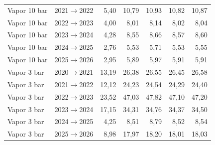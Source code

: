 {\begin{xltabular}{\linewidth}{@{}llrrrrr@{}}
Vapor 10 bar & 2021$\to$2022 & 5,40 & 10,79 & 10,93 & 10,82 & 10,87 \\
Vapor 10 bar & 2022$\to$2023 & 4,00 & 8,01 & 8,14 & 8,02 & 8,04 \\
Vapor 10 bar & 2023$\to$2024 & 4,28 & 8,55 & 8,66 & 8,57 & 8,60 \\
Vapor 10 bar & 2024$\to$2025 & 2,76 & 5,53 & 5,71 & 5,53 & 5,55 \\
Vapor 10 bar & 2025$\to$2026 & 2,95 & 5,89 & 5,97 & 5,91 & 5,91 \\
Vapor 3 bar & 2020$\to$2021 & 13,19 & 26,38 & 26,55 & 26,45 & 26,58 \\
Vapor 3 bar & 2021$\to$2022 & 12,12 & 24,23 & 24,54 & 24,29 & 24,40 \\
Vapor 3 bar & 2022$\to$2023 & 23,52 & 47,03 & 47,82 & 47,10 & 47,20 \\
Vapor 3 bar & 2023$\to$2024 & 17,15 & 34,31 & 34,76 & 34,37 & 34,50 \\
Vapor 3 bar & 2024$\to$2025 & 4,25 & 8,51 & 8,79 & 8,52 & 8,54 \\
Vapor 3 bar & 2025$\to$2026 & 8,98 & 17,97 & 18,20 & 18,01 & 18,03 \\
\end{xltabular}
}
